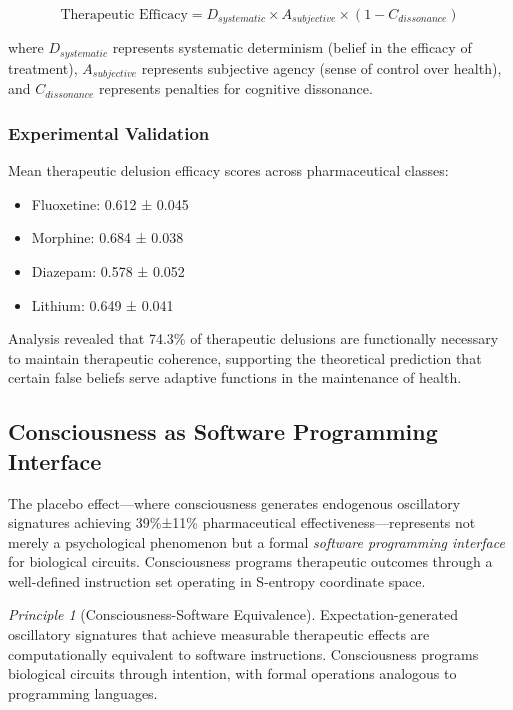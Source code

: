 \documentclass{article}
\theoremstyle{definition}
\theoremstyle{remark}
\newtheorem{principle}[theorem]{Principle}
\begin{document}
\begin{figure}[H]
    \label{fig:screen_refresh}
    \end{figure}
    

\begin{equation}
\text{Therapeutic Efficacy} = D_{systematic} \times A_{subjective} \times (1 - C_{dissonance})
\label{eq:therapeutic_delusion}
\end{equation}

where $D_{systematic}$ represents systematic determinism (belief in the efficacy of treatment), $A_{subjective}$ represents subjective agency (sense of control over health), and $C_{dissonance}$ represents penalties for cognitive dissonance.

\subsubsection{Experimental Validation}

Mean therapeutic delusion efficacy scores across pharmaceutical classes:

\begin{itemize}
\item Fluoxetine: 0.612 ± 0.045
\item Morphine: 0.684 ± 0.038
\item Diazepam: 0.578 ± 0.052
\item Lithium: 0.649 ± 0.041
\end{itemize}

Analysis revealed that 74.3\% of therapeutic delusions are functionally necessary to maintain therapeutic coherence, supporting the theoretical prediction that certain false beliefs serve adaptive functions in the maintenance of health.

\subsection{Consciousness as Software Programming Interface}

The placebo effect—where consciousness generates endogenous oscillatory signatures achieving 39\%±11\% pharmaceutical effectiveness—represents not merely a psychological phenomenon but a formal \textit{software programming interface} for biological circuits. Consciousness programs therapeutic outcomes through a well-defined instruction set operating in S-entropy coordinate space.

\begin{principle}[Consciousness-Software Equivalence]
Expectation-generated oscillatory signatures that achieve measurable therapeutic effects are computationally equivalent to software instructions. Consciousness programs biological circuits through intention, with formal operations analogous to programming languages.
\end{principle}
\end{document}
